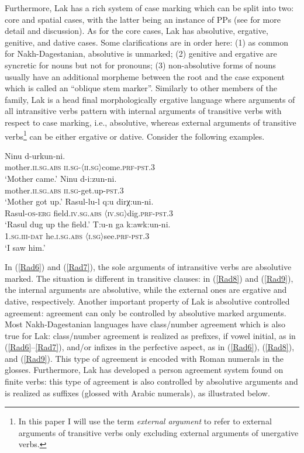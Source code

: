 \documentclass[output=paper]{langscibook}
\begin{document}
Furthermore, Lak has a rich system of case marking which can be split into two: core and spatial cases, with the latter being an instance of PPs (see \citet{Radkevich2010} for more detail and discussion). As for the core cases, Lak has absolutive, ergative, genitive, and dative cases. Some clarifications are in order here: (1) as common for Nakh-Dagestanian, absolutive is unmarked; (2) genitive and ergative are syncretic for nouns but not for pronouns; (3) non-absolutive forms of nouns usually have an additional morpheme between the root and the case exponent which is called an ``oblique stem marker''.
Similarly to other members of the family, Lak is a head final morphologically ergative language where arguments of all intransitive verbs pattern with internal arguments of transitive verbs with respect to case marking, i.e., absolutive, whereas external arguments of transitive verbs\footnote{In this paper I will use the term \emph{external argument} to refer to external arguments of transitive verbs only excluding external arguments of unergative verbs.} can be either ergative or dative. Consider the following examples.\largerpage[1.75]

\ea\label{Rad6}
\gll Ninu d-urkun-ni.\\
mother.\textsc{ii.sg.abs} \textsc{ii.sg}-\textsc{〈ii.sg〉}come.\textsc{prf}-\textsc{pst.3}\\
\glt ‘Mother came.’
\ex\label{Rad7}
\gll Ninu d-i:zun-ni.\\
mother.\textsc{ii.sg.abs} \textsc{ii.sg}-get.up-\textsc{pst.3}\\
\glt ‘Mother got up.’
\ex\label{Rad8}
\gll Rasul-lu-l q:u dirχ:un-ni.\\
Rasul-\textsc{os-erg} field.\textsc{iv.sg.abs} \textsc{〈iv.sg〉}dig.\textsc{prf-pst.3}\\
\glt ‘Rasul dug up the field.’
\ex\label{Rad9}
\gll T:u-n ga k:awk:un-ni.\\ 
\textsc{1.sg.iii-dat} he.\textsc{i.sg.abs} \textsc{〈i.sg〉}see.\textsc{prf-pst.3}\\
\glt ‘I saw him.’
\z

In (\ref{Rad6}) and (\ref{Rad7}), the sole arguments of intransitive verbs are absolutive marked. 
The situation is different in transitive clauses: 
in (\ref{Rad8}) and (\ref{Rad9}), the internal arguments are absolutive, while the external ones are ergative and dative, respectively. 
Another important property of Lak is absolutive controlled agreement: agreement can only be controlled by absolutive marked arguments. 
Most Nakh-Dagestanian languages have class/number agreement which is also true for Lak: 
class/number agreement is realized as prefixes, if vowel initial, as in (\ref{Rad6}--\ref{Rad7}), 
and/or infixes in the perfective aspect, as in (\ref{Rad6}), (\ref{Rad8}), and (\ref{Rad9}). 
This type of agreement is encoded with Roman numerals in the glosses. 
Furthermore, Lak has developed a person agreement system found on finite verbs: 
this type of agreement is also controlled by absolutive arguments and is realized as suffixes (glossed with Arabic numerals), as illustrated below.
\end{document}
